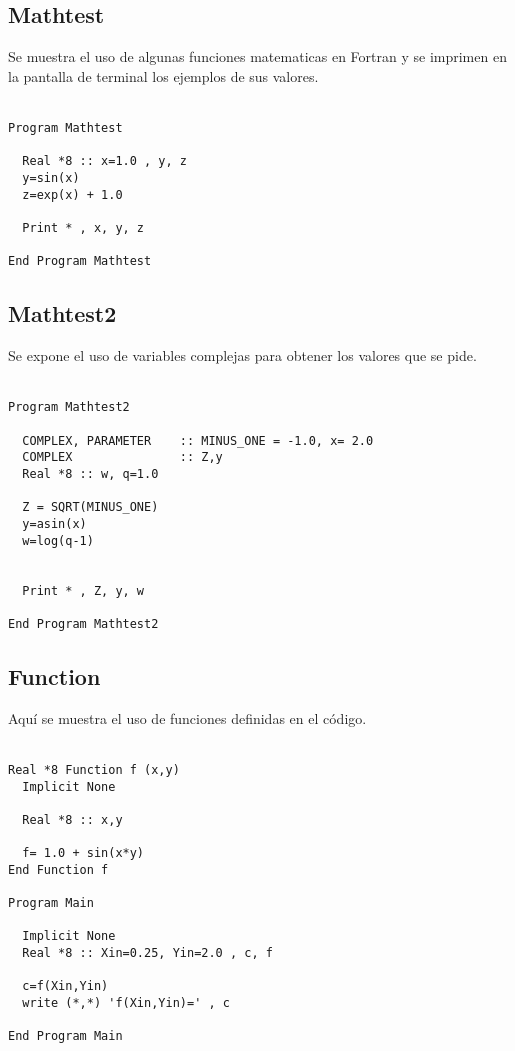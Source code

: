 \documentclass{article}
\begin{document}
\subsection*{Mathtest}
Se muestra el uso de algunas funciones matematicas en Fortran y se imprimen en la pantalla de terminal los ejemplos de sus valores.\\ \\

	
\begin{Verbatim}[frame=single]
Program Mathtest
  
  Real *8 :: x=1.0 , y, z 
  y=sin(x)
  z=exp(x) + 1.0
  
  Print * , x, y, z

End Program Mathtest
\end{Verbatim}


\subsection*{Mathtest2}
Se expone el uso de variables complejas para obtener los valores que se pide.\\ \\
	
	
		
\begin{Verbatim}[frame=single]
Program Mathtest2
  
  COMPLEX, PARAMETER    :: MINUS_ONE = -1.0, x= 2.0
  COMPLEX               :: Z,y
  Real *8 :: w, q=1.0

  Z = SQRT(MINUS_ONE)
  y=asin(x)
  w=log(q-1)

  
  Print * , Z, y, w

End Program Mathtest2

\end{Verbatim}
	
\subsection*{Function}
Aqu\'i se muestra el uso de funciones definidas en el c\'odigo.\\ \\
	
	
		
\begin{Verbatim}[frame=single]
Real *8 Function f (x,y)
  Implicit None

  Real *8 :: x,y 

  f= 1.0 + sin(x*y)
End Function f

Program Main

  Implicit None
  Real *8 :: Xin=0.25, Yin=2.0 , c, f

  c=f(Xin,Yin)
  write (*,*) 'f(Xin,Yin)=' , c

End Program Main

\end{Verbatim}
\end{document}
